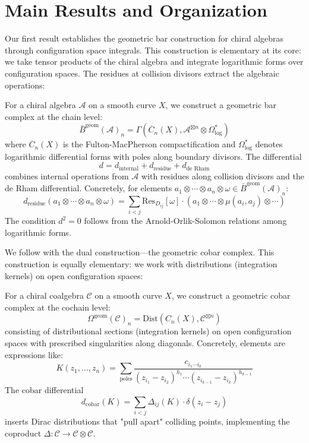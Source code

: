 \section{Main Results and Organization}

Our first result establishes the geometric bar construction for chiral algebras through configuration space integrals. This construction is elementary at its core: we take tensor products of the chiral algebra and integrate logarithmic forms over configuration spaces. The residues at collision divisors extract the algebraic operations:

\begin{theorem}
For a chiral algebra $\mathcal{A}$ on a smooth curve $X$, we construct a geometric bar complex at the chain level:
$$\bar{B}^{\text{geom}}(\mathcal{A})_n = \Gamma\left(\overline{C}_n(X), \mathcal{A}^{\boxtimes n} \otimes \Omega^*_{\text{log}}\right)$$
where $\overline{C}_n(X)$ is the Fulton-MacPherson compactification and $\Omega^*_{\text{log}}$ denotes logarithmic differential forms with poles along boundary divisors. The differential 
$$d = d_{\text{internal}} + d_{\text{residue}} + d_{\text{de Rham}}$$
combines internal operations from $\mathcal{A}$ with residues along collision divisors and the de Rham differential. Concretely, for elements $a_1 \otimes \cdots \otimes a_n \otimes \omega \in \bar{B}^{\text{geom}}(\mathcal{A})_n$:
$$d_{\text{residue}}(a_1 \otimes \cdots \otimes a_n \otimes \omega) = \sum_{i<j} \text{Res}_{D_{ij}}[\omega] \cdot (a_1 \otimes \cdots \otimes \mu(a_i, a_j) \otimes \cdots)$$
The condition $d^2 = 0$ follows from the Arnold-Orlik-Solomon relations among logarithmic forms.
\end{theorem}

We follow with the dual construction—the geometric cobar complex. This construction is equally elementary: we work with distributions (integration kernels) on open configuration spaces:

\begin{theorem}
For a chiral coalgebra $\mathcal{C}$ on a smooth curve $X$, we construct a geometric cobar complex at the cochain level:
$$\Omega^{\text{geom}}(\mathcal{C})_n = \text{Dist}(C_n(X), \mathcal{C}^{\boxtimes n})$$
consisting of distributional sections (integration kernels) on open configuration spaces with prescribed singularities along diagonals. Concretely, elements are expressions like:
$$K(z_1, \ldots, z_n) = \sum_{\text{poles}} \frac{c_{i_1 \cdots i_k}}{(z_{i_1} - z_{i_2})^{h_1} \cdots (z_{i_{k-1}} - z_{i_k})^{h_{k-1}}}$$
The cobar differential
$$d_{\text{cobar}}(K) = \sum_{i<j} \Delta_{ij}(K) \cdot \delta(z_i - z_j)$$
inserts Dirac distributions that "pull apart" colliding points, implementing the coproduct $\Delta: \mathcal{C} \to \mathcal{C} \otimes \mathcal{C}$.
\end{theorem}

